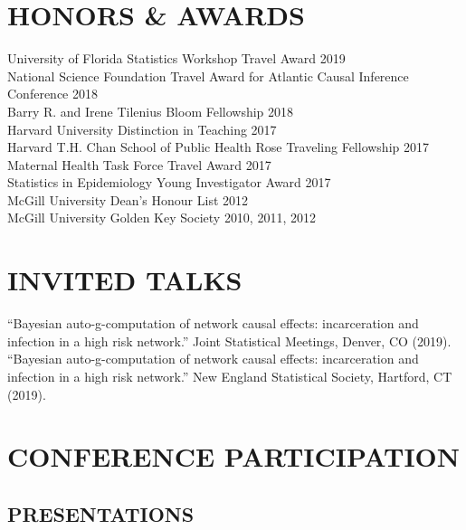 \documentclass[12pt]{article}
\begin{document}
\section*{\textbf{{\large H}{ONORS} {\large \&} {\large A}{WARDS}}}
University of Florida Statistics Workshop Travel Award \hfill \hfill 2019 \\
National Science Foundation Travel Award for Atlantic Causal Inference Conference \hfill \hfill	2018 \\
Barry R. and Irene Tilenius Bloom Fellowship \hfill \hfill	2018 \\
Harvard University Distinction in Teaching \hfill \hfill 2017 \\
Harvard T.H. Chan School of Public Health Rose Traveling Fellowship \hfill \hfill	2017 \\
Maternal Health Task Force Travel Award \hfill \hfill	2017 \\
Statistics in Epidemiology Young Investigator Award  \hfill \hfill	2017 \\
McGill University Dean's Honour List  \hfill \hfill	2012 \\
McGill University Golden Key Society  \hfill \hfill2010, 2011, 2012 


\section*{\textbf{{\large I}{NVITED} {\large T}{ALKS}}}   

``Bayesian auto-g-computation of network causal effects: incarceration and infection in a high risk network.'' Joint Statistical Meetings, Denver, CO (2019). \\

``Bayesian auto-g-computation of network causal effects: incarceration and infection in a high risk network.'' New England Statistical Society, Hartford, CT (2019). 

\section*{\textbf{{\large C}{ONFERENCE} {\large P}{ARTICIPATION}}}  

\subsection*{\textbf{PRESENTATIONS}}
\end{document}
